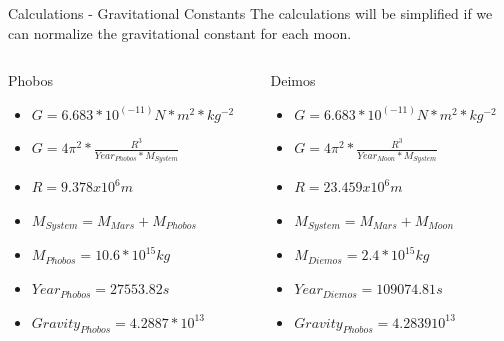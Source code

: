 \documentclass{beamer}	%
\begin{document}
\begin{frame}{Calculations - Gravitational Constants}
The calculations will be simplified if we can normalize the gravitational constant for each moon.

\begin{columns} %
 
 \begin{column}{0.50\textwidth} %
  \begin{block}{Phobos} %
   \begin{itemize}
   	\item $G = 6.683*10^(-11) N*m^2*kg^{-2}$
     \item $G = 4\pi ^{2}*\frac{R^{3}}{Year_{Phobos}*M_{System}}$
     \item $R =  9.378 x 10^6m$
	\item $M_{System} = M_{Mars} + M_{Phobos}$
	\item $M_{Phobos} = 10.6 * 10^{15} kg$
	\item $Year_{Phobos} = 27553.82 s$
	\item $Gravity_{Phobos} = 4.2887 * 10^{13}$
   \end{itemize}
  \end{block}
 \end{column}

 \begin{column}{0.50\textwidth} %
  \begin{block}{Deimos}
   \begin{itemize}
     \item $G = 6.683*10^(-11) N*m^2*kg^{-2}$
     \item $G = 4\pi ^{2}*\frac{R^{3}}{Year_{Moon}*M_{System}}$
     \item $R =  23.459 x 10^6m$
	\item $M_{System} = M_{Mars} + M_{Moon}$
	\item $M_{Diemos} = 2.4 * 10^{15} kg$
	\item $Year_{Diemos} = 109074.81 s$
	\item $Gravity_{Phobos} = 4.2839  10^{13}$
   \end{itemize}
  \end{block}
 \end{column}

\end{columns}

 \end{frame}
\end{document}

